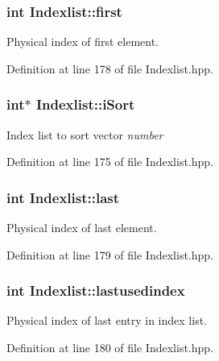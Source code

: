 \subsubsection[{first}]{\setlength{\rightskip}{0pt plus 5cm}int {\bf Indexlist::first}\hspace{0.3cm}{\ttfamily  [protected]}}\label{classIndexlist_aa793a1cba24ff6b678eff5dbc95db371}
Physical index of first element. 

Definition at line 178 of file Indexlist.hpp.

\subsubsection[{iSort}]{\setlength{\rightskip}{0pt plus 5cm}int$\ast$ {\bf Indexlist::iSort}\hspace{0.3cm}{\ttfamily  [protected]}}\label{classIndexlist_aa07b79966c07a7ca547a19359bae2efc}
Index list to sort vector {\itshape number\/} 

Definition at line 175 of file Indexlist.hpp.

\subsubsection[{last}]{\setlength{\rightskip}{0pt plus 5cm}int {\bf Indexlist::last}\hspace{0.3cm}{\ttfamily  [protected]}}\label{classIndexlist_a7201ead49241e67e1f11415235192052}
Physical index of last element. 

Definition at line 179 of file Indexlist.hpp.

\subsubsection[{lastusedindex}]{\setlength{\rightskip}{0pt plus 5cm}int {\bf Indexlist::lastusedindex}\hspace{0.3cm}{\ttfamily  [protected]}}\label{classIndexlist_ac3eec3cee5e4eaa0bb335be9ee8d7df5}
Physical index of last entry in index list. 

Definition at line 180 of file Indexlist.hpp.

